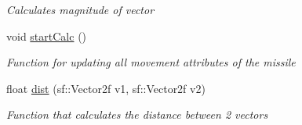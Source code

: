 \begin{DoxyCompactItemize}
\begin{DoxyCompactList}\small\item\em Calculates magnitude of vector \end{DoxyCompactList}\item 
void \mbox{\hyperlink{class_missile_aa7d46b6d539ed741f55f5d9137bda2ff}{start\+Calc}} ()
\begin{DoxyCompactList}\small\item\em Function for updating all movement attributes of the missile \end{DoxyCompactList}\item 
float \mbox{\hyperlink{class_missile_a0a101a13350fb8af75465e2cdcf01931}{dist}} (sf\+::\+Vector2f v1, sf\+::\+Vector2f v2)
\begin{DoxyCompactList}\small\item\em Function that calculates the distance between 2 vectors \end{DoxyCompactList}\end{DoxyCompactItemize}
